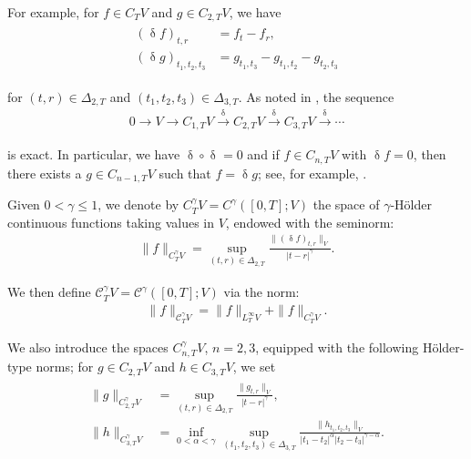 \documentclass[letterpaper, 11pt,  reqno]{amsart}
\newcommand{\1}{\hspace{0.5mm}\textup{I}\hspace{0.5mm}}
\newcommand{\noi}{\noindent}
\newcommand{\CC}{\mathcal{C}}
\newcommand{\al}{\alpha}
\newcommand{\updl}{\updelta}
\newcommand{\Dl}{\Delta}
\newcommand{\g}{\gamma}
\newcommand{\too}{\longrightarrow}
\numberwithin{equation}{section}
\numberwithin{theorem}{section}
\begin{document}
\noi
For example, for $f\in C_T V$
and 
$g\in C_{2,T} V$, 
we have 
\begin{align}
\begin{split}
(\updl f )_{t,r} &= f_t - f_r, \\
(\updl g)_{t_1,t_2,t_3} &= 
g_{t_1,t_3} - g_{t_1,t_2} - g_{t_2,t_3}
\end{split}
\label{dl1}
\end{align}



\noi
for $(t,r)\in\Dl_{2,T}$
and $(t_1,t_2,t_3) \in \Dl_{3,T}$.
As noted in \cite{GT10}, 
the sequence 
\begin{align*}
0 \too V \too C_{1, T}V \stackrel{\updl}{\too} C_{2, T}V
\stackrel{\updl}{\too} C_{3, T}V
\stackrel{\updl}{\too} \cdots
\end{align*}

\noi
is exact. 
In particular, we have 
 $\updl\circ\updl =0$ and 
if $f \in C_{n,T} V$ with $\updl f =0$, 
then there exists a $g\in C_{n-1,T}V$ 
such that $f= \updl g$; 
see, for example,  \cite[Lemma 2.1]{GT10}. 


Given $0 < \g \le 1$, we denote by $C^\g_T V = C^\g([0, T]; V)$ the space of $\g$-H\"older continuous functions taking values in $V$, endowed  with the seminorm:
\begin{align*}
\|f\|_{C^\g_T V} = \sup_{(t,r)\in \Dl_{2,T}} 
\frac{\|(\updl f)_{t,r}\|_V}{|t-r|^\g}.
\end{align*}

\noi
We then define 
 $\CC^\g_T V = \CC^\g([0, T]; V)$ via the norm:
\begin{align*}
\| f \|_{\CC^\g_TV} = \| f \|_{L^\infty_TV} + \|f\|_{C^\g_T V}.
\end{align*}


\noi 
We also introduce the spaces 
$C^\g_{n,T}V$, $n=2,3$, 
equipped with the following H\"older-type norms;
 for $g\in C_{2,T}V$ and $h\in C_{3,T}V$, we set
\begin{align}
\begin{split}
\| g\|_{C^\g_{2,T} V} & 
= \sup_{(t,r) \in \Dl_{2,T}} \frac{\|g_{t,r} \|_{V} }{|t-r|^{\g}}, \\
\| h\|_{C^\g_{3,T} V} & 
= \inf_{0<\al<\g} 
\sup_{(t_1,t_2,t_3) \in \Dl_{3,T}} 
\frac{ \|h_{t_1,t_2,t_3}\|_V}
{|t_1-t_2|^{\al} |t_2-t_3|^{\g-\al}}.
\end{split}
\label{Ho2}
\end{align}




\medskip
\end{document}
